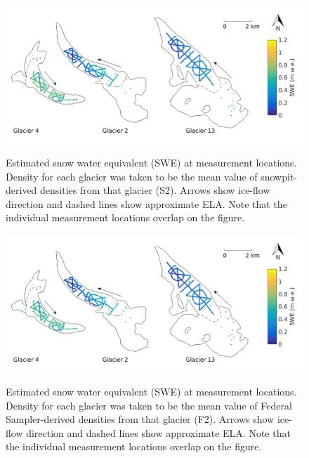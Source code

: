 \documentclass{sfuthesis}
\begin{document}
\begin{figure}[H]
	\centering
	\includegraphics[width =\textwidth]{SWEmap_opt4.png}\\
	\caption{Estimated snow water equivalent (SWE) at measurement locations. Density for each glacier was taken to be the mean value of snowpit-derived densities from that glacier (S2). Arrows show ice-flow direction and dashed lines show approximate ELA. Note that the individual measurement locations overlap on the figure.}
	\label{fig:SWEmap_S2}
\end{figure}

\begin{figure}[H]
	\centering
	\includegraphics[width = \textwidth]{SWEmap_opt5.png}\\
	\caption{Estimated snow water equivalent (SWE) at measurement locations. Density for each glacier was taken to be the mean value of Federal Sampler-derived densities from that glacier (F2). Arrows show ice-flow direction and dashed lines show approximate ELA. Note that the individual measurement locations overlap on the figure.}
	\label{fig:SWEmap_F2}
\end{figure}
\end{document}
